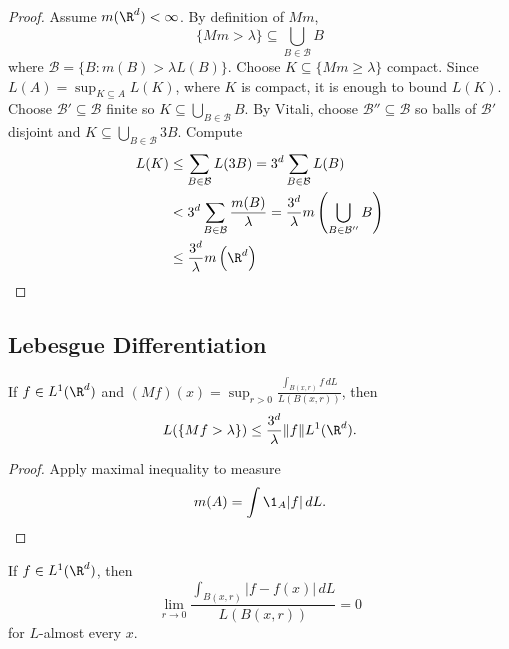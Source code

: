 \begin{proof}
  Assume $m(\R^d) < \infty$. By definition of $Mm$,
  \[
    \{ Mm > \lambda \} \subseteq \bigcup_{B \in \mathcal{B}} B
  \]
  where $\mathcal{B} = \{B : m(B) > \lambda L(B) \}$.
  Choose $K \subseteq\{Mm \geq \lambda\}$ compact. Since $L(A) = \sup_{K \subseteq A} L(K)$, where $K$ is compact, it is enough to bound $L(K)$.
  Choose $\mathcal{B}' \subseteq \mathcal{B}$ finite so $K \subseteq \bigcup_{B \in \mathcal{B}} B$.
  By Vitali, choose $\mathcal{B}'' \subseteq \mathcal{B}$ so balls of $\mathcal{B}'$ disjoint and $K \subseteq \bigcup_{B \in \mathcal{B}} 3B$.
  Compute
  \begin{align*}
    L(K) & \leq \sum_{B \in \mathcal{B}} L(3B) = 3^d \sum_{B \in \mathcal{B}} L(B) \\
         & < 3^d \sum_{B \in \mathcal{B}} \frac{m(B)}{\lambda} = \frac{3^d}{\lambda} m \left(\bigcup_{B \in \mathcal{B}''} B\right) \\
         & \leq \frac{3^d}{\lambda} m \left( \R^d \right)
  \end{align*}
\end{proof}

\subsection{Lebesgue Differentiation}

\begin{corollary}
  If $f \in L^1 (\R^d)$ and $(Mf)(x) = \sup_{r > 0} \frac{\int_{B(x,r)} f \, dL}{L(B(x,r))}$, then
  \[
    L(\{Mf > \lambda \}) \leq \frac{3^d}{\lambda} \| f \| L^1(\R^d).
  \]
\end{corollary}

\begin{proof}
  Apply maximal inequality to measure
  \[
    m(A) = \int \1_A |f| \, dL.
  \]
\end{proof}

\begin{theorem}
  If $f \in L^1(\R^d)$, then
  \[
    \lim_{r \to 0} \frac{\int_{B(x,r)}|f - f(x)| \, dL}{L(B(x,r))} = 0
  \]
  for $L$-almost every $x$.
\end{theorem}

